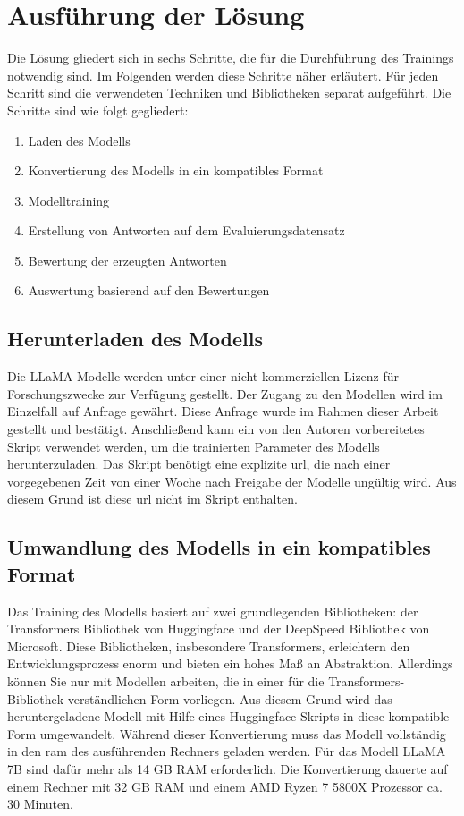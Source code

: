 \chapter{Ausführung der Lösung}\label{ch:solution}

Die Lösung gliedert sich in sechs Schritte, die für die Durchführung des Trainings notwendig sind.
Im Folgenden werden diese Schritte näher erläutert. Für jeden Schritt sind die verwendeten Techniken und Bibliotheken separat aufgeführt.
Die Schritte sind wie folgt gegliedert:
\begin{enumerate}
    \item Laden des Modells
    \item Konvertierung des Modells in ein kompatibles Format
    \item Modelltraining
    \item Erstellung von Antworten auf dem Evaluierungsdatensatz
    \item Bewertung der erzeugten Antworten
    \item Auswertung basierend auf den Bewertungen
\end{enumerate}

\section{Herunterladen des Modells}
Die LLaMA-Modelle werden unter einer nicht-kommerziellen Lizenz für Forschungszwecke zur Verfügung gestellt. Der Zugang zu den Modellen wird im Einzelfall auf Anfrage gewährt. Diese Anfrage wurde im Rahmen dieser Arbeit gestellt und bestätigt.
Anschließend kann ein von den Autoren vorbereitetes Skript verwendet werden, um die trainierten Parameter des Modells herunterzuladen.
Das Skript benötigt eine explizite \ac{url}, die nach einer vorgegebenen Zeit von einer Woche nach Freigabe der Modelle ungültig wird. Aus diesem Grund ist diese \ac{url} nicht im Skript enthalten.

\section{Umwandlung des Modells in ein kompatibles Format}
Das Training des Modells basiert auf zwei grundlegenden Bibliotheken: der Transformers Bibliothek von Huggingface und der DeepSpeed Bibliothek von Microsoft.
Diese Bibliotheken, insbesondere Transformers, erleichtern den Entwicklungsprozess enorm und bieten ein hohes Maß an Abstraktion. Allerdings können Sie nur mit Modellen arbeiten, die in einer für die Transformers-Bibliothek verständlichen Form vorliegen.
Aus diesem Grund wird das heruntergeladene Modell mit Hilfe eines Huggingface-Skripts in diese kompatible Form umgewandelt.
Während dieser Konvertierung muss das Modell vollständig in den \ac{ram} des ausführenden Rechners geladen werden. Für das Modell LLaMA 7B sind dafür mehr als 14 GB RAM erforderlich.
Die Konvertierung dauerte auf einem Rechner mit 32 GB RAM und einem AMD Ryzen 7 5800X Prozessor ca. 30 Minuten.

